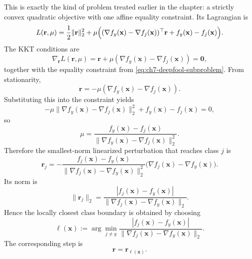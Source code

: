 \begin{example}
This is exactly the kind of problem treated earlier in the chapter: a strictly
convex quadratic objective with one affine equality constraint. Its Lagrangian
is
\[
  L(\mathbf{r},\mu)
  =
  \frac12 \|\mathbf{r}\|_2^2
  +
  \mu\Bigl(
    (\nabla f_y(\mathbf{x})-\nabla f_j(\mathbf{x}))^\top \mathbf{r}
    + f_y(\mathbf{x}) - f_j(\mathbf{x})
  \Bigr).
\]
The KKT conditions are
\[
  \nabla_{\mathbf{r}}L(\mathbf{r},\mu)
  =
  \mathbf{r} + \mu(\nabla f_y(\mathbf{x})-\nabla f_j(\mathbf{x}))
  = \mathbf{0},
\]
together with the equality constraint from
\eqref{eq:ch7-deepfool-subproblem}. From stationarity,
\[
  \mathbf{r}
  =
  -\mu(\nabla f_y(\mathbf{x})-\nabla f_j(\mathbf{x})).
\]
Substituting this into the constraint yields
\[
  -\mu\|\nabla f_y(\mathbf{x})-\nabla f_j(\mathbf{x})\|_2^2
  + f_y(\mathbf{x}) - f_j(\mathbf{x})
  = 0,
\]
so
\[
  \mu
  =
  \frac{f_y(\mathbf{x})-f_j(\mathbf{x})}
  {\|\nabla f_y(\mathbf{x})-\nabla f_j(\mathbf{x})\|_2^2}.
\]
Therefore the smallest-norm linearized perturbation that reaches class
$j$ is
\begin{equation}
  \label{eq:ch7-deepfool-rj}
  \mathbf{r}_j
  =
  -
  \frac{f_j(\mathbf{x})-f_y(\mathbf{x})}
  {\|\nabla f_j(\mathbf{x})-\nabla f_y(\mathbf{x})\|_2^2}
  \bigl(\nabla f_j(\mathbf{x})-\nabla f_y(\mathbf{x})\bigr).
\end{equation}
Its norm is
\[
  \|\mathbf{r}_j\|_2
  =
  \frac{|f_j(\mathbf{x})-f_y(\mathbf{x})|}
  {\|\nabla f_j(\mathbf{x})-\nabla f_y(\mathbf{x})\|_2}.
\]
Hence the locally closest class boundary is obtained by choosing
\begin{equation}
  \label{eq:ch7-deepfool-class-choice}
  \ell(\mathbf{x})
  :=
  \arg\min_{j\neq y}
  \frac{|f_j(\mathbf{x})-f_y(\mathbf{x})|}
  {\|\nabla f_j(\mathbf{x})-\nabla f_y(\mathbf{x})\|_2}.
\end{equation}
The corresponding step is
\[
  \mathbf{r}
  =
  \mathbf{r}_{\ell(\mathbf{x})}.
\]


\end{example}
